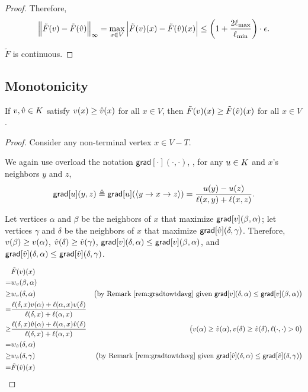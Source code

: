 \documentclass[12pt]{amsart}
\newcommand{\grad}{\ensuremath{\mathsf{grad}}}
\renewcommand{\path}[1]{\ensuremath{\langle {#1} \rangle}}
\begin{document}
\begin{proof}
Therefore,
$$\left\lVert \tilde{F}(v)-\tilde{F}(\hat{v}) \right\rVert_{\infty} = \max_{x\in V} \left| \tilde{F}(v)(x)-\tilde{F}(\hat{v})(x) \right| \leq \left({1+\frac{2\ell_{\max}}{\ell_{\min}}}\right)\cdot\epsilon.$$

$\tilde{F}$ is continuous.

\end{proof}

\subsection{Monotonicity}
\begin{lemma}\label{lem:wtdmonotonicity}
If $v, \hat{v}\in K$ satisfy $v(x) \geq \hat{v}(x)$ for all $x\in V$, then $\tilde{F}(v)(x) \geq \tilde{F}(\hat{v})(x)$ for all $x\in V$.
\end{lemma}
\begin{proof}
Consider any non-terminal vertex $x\in V-T$.

We again use overload the notation $\grad[\cdot](\cdot,\cdot)$, \ie, for any $u\in K$ and $x$'s neighbors $y$ and $z$, $$\grad[\V{u}](y,z) \triangleq \grad[\V{u}](\path{y\to x\to z}) = \frac{\V{u}(y)-\V{u}(z)}{\ell(x,y)+\ell(x,z)}.$$

Let vertices $\alpha$ and $\beta$ be the neighbors of $x$ that maximize $\grad[\V{v}](\beta,\alpha)$; let vertices $\gamma$ and $\delta$ be the neighbors of $x$ that maximize $\grad[\V{\hat{v}}](\delta,\gamma)$. Therefore, $v(\beta)\geq v(\alpha)$, $\hat{v}(\delta)\geq\hat{v}(\gamma)$, $\grad[\V{v}](\delta, \alpha)\leq \grad[\V{v}](\beta,\alpha)$, and $\grad[\V{\hat{v}}](\delta,\alpha) \leq \grad[\V{\hat{v}}](\delta,\gamma)$.

\begin{align*}
&\tilde{F}(\V{v})(x)\\
=&w_{\V{v}}(\beta, \alpha) \\
\geq & w_{\V{v}}(\delta, \alpha) &\paren{\text{by Remark~\ref{rem:gradtowtdavg} given } \grad[\V{v}](\delta, \alpha)\leq \grad[\V{v}](\beta,\alpha)} \\
=&\frac{\ell(\delta,x)\V{v}(\alpha)+\ell(\alpha,x)\V{v}(\delta)}{\ell(\delta,x)+\ell(\alpha,x)} \\
\geq&\frac{\ell(\delta,x)\V{\hat{v}}(\alpha)+\ell(\alpha,x)\V{\hat{v}}(\delta)}{\ell(\delta,x)+\ell(\alpha,x)} & \paren{\V{v}(\alpha)\geq\V{\hat{v}}(\alpha), \V{v}(\delta)\geq\V{\hat{v}}(\delta), \ell(\cdot, \cdot)>0} \\
=&w_{\V{\hat{v}}}(\delta,\alpha)\\
\geq& w_{\V{\hat{v}}}(\delta,\gamma) &\paren{\text{by Remark~\ref{rem:gradtowtdavg} given } \grad[\V{\hat{v}}](\delta,\alpha) \leq \grad[\V{\hat{v}}](\delta,\gamma)} \\
=& \tilde{F}(\V{\hat{v}})(x)
\end{align*}


\end{proof}
\end{document}
